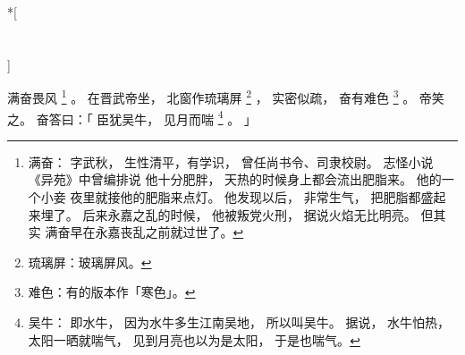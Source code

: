 
\switchcolumn[0]*[\section{}]

满奋畏风%
\footnote{%
    满奋：
        字武秋，
        生性清平，有学识，
        曾任尚书令、司隶校尉。
        志怪小说《异苑》中曾编排说
        他十分肥胖，
        天热的时候身上都会流出肥脂来。
        他的一个小妾
        夜里就接他的肥脂来点灯。
        他发现以后，
        非常生气，
        把肥脂都盛起来埋了。
        后来永嘉之乱的时候，
        他被叛党火刑，
        据说火焰无比明亮。
        但其实
        满奋早在永嘉丧乱之前就过世了。
}%
。
在晋武帝坐，
北窗作琉璃屏%
\footnote{%
    琉璃屏：玻璃屏风。
}%
，
实密似疏，
奋有难色%
\footnote{%
    难色：有的版本作「寒色」。
}%
。
帝笑之。
奋答曰：「
    臣犹吴牛，
    见月而喘%
    \footnote{%
        吴牛：
            即水牛，
            因为水牛多生江南吴地，
            所以叫吴牛。
            据说，
            水牛怕热，
            太阳一晒就喘气，
            见到月亮也以为是太阳，
            于是也喘气。
    }%
    。
」

\switchcolumn



